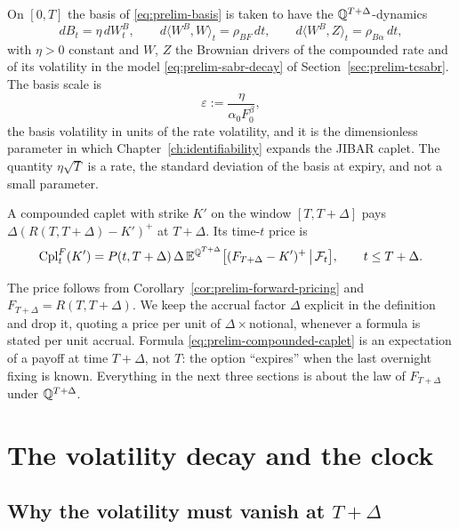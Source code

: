 \documentclass[../../../main.tex]{subfiles}
\begin{document}
\begin{definition}\label{def:prelim-basis-dyn}
On $[0,T]$ the basis of \eqref{eq:prelim-basis} is taken to have the $\mathbb{Q}^{T+\Delta}$-dynamics
\[
dB_t=\eta\,dW^{B}_t,\qquad d\langle W^{B},W\rangle_t=\rho_{BF}\,dt,\qquad d\langle W^{B},Z\rangle_t=\rho_{B\alpha}\,dt,
\]
with $\eta>0$ constant and $W$, $Z$ the Brownian drivers of the compounded rate and of its volatility in the model \eqref{eq:prelim-sabr-decay} of Section~\ref{sec:prelim-tcsabr}. The basis scale is
\[
\varepsilon:=\frac{\eta}{\alpha_0F_0^{\beta}},
\]
the basis volatility in units of the rate volatility, and it is the dimensionless parameter in which Chapter~\ref{ch:identifiability} expands the JIBAR caplet. The quantity $\eta\sqrt T$ is a rate, the standard deviation of the basis at expiry, and not a small parameter.
\end{definition}

\begin{definition}\label{def:prelim-compounded-caplet}
A compounded caplet with strike $K'$ on the window $[T,T+\Delta]$ pays $\Delta(R(T,T+\Delta)-K')^+$ at $T+\Delta$. Its time-$t$ price is
\begin{equation}\label{eq:prelim-compounded-caplet}
\mathrm{Cpl}^{F}_t(K')=P(t,T+\Delta)\,\Delta\,\mathbb{E}^{\mathbb{Q}^{T+\Delta}}\big[(F_{T+\Delta}-K')^+\,\big|\,\mathcal F_t\big],\qquad t\le T+\Delta .
\end{equation}
\end{definition}

The price follows from Corollary~\ref{cor:prelim-forward-pricing} and $F_{T+\Delta}=R(T,T+\Delta)$. We keep the accrual factor $\Delta$ explicit in the definition and drop it, quoting a price per unit of $\Delta\times$notional, whenever a formula is stated per unit accrual. Formula \eqref{eq:prelim-compounded-caplet} is an expectation of a payoff at time $T+\Delta$, not $T$: the option ``expires'' when the last overnight fixing is known. Everything in the next three sections is about the law of $F_{T+\Delta}$ under $\mathbb{Q}^{T+\Delta}$.

\section{The volatility decay and the clock}\label{sec:prelim-decay}

\subsection{Why the volatility must vanish at $T+\Delta$}
\end{document}
